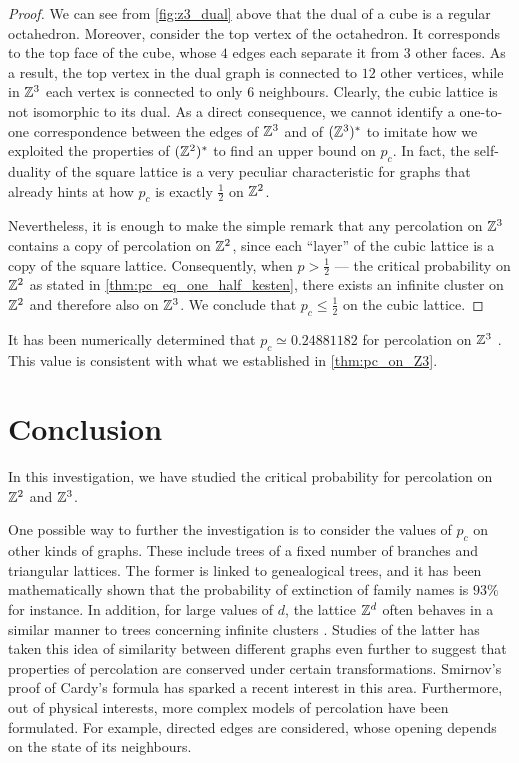 \documentclass[a4paper, 12pt]{article}
\begin{document}
\begin{proof}
We can see from \cref{fig:z3_dual} above that the dual of a cube is a regular octahedron. Moreover, consider the top vertex of the octahedron. It corresponds to the top face of the cube, whose $4$ edges each separate it from $3$ other faces. As a result, the top vertex in the dual graph is connected to $12$ other vertices, while in $\mathbb{Z}^3$ each vertex is connected to only $6$ neighbours. Clearly, the cubic lattice is not isomorphic to its dual. As a direct consequence, we cannot identify a one-to-one correspondence between the edges of $\mathbb{Z}^3$ and of $(\mathbb{Z}^3)^*$ to imitate how we exploited the properties of $(\mathbb{Z}^2)^*$ to find an upper bound on $p_c$. In fact, the self-duality of the square lattice is a very peculiar characteristic for graphs that already hints at how $p_c$ is exactly $\frac{1}{2}$ on $\mathbb{Z}^2$.

Nevertheless, it is enough to make the simple remark that any percolation on $\mathbb{Z}^3$ contains a copy of percolation on $\mathbb{Z}^2$, since each ``layer'' of the cubic lattice is a copy of the square lattice. Consequently, when $p > \frac{1}{2}$ --- the critical probability on $\mathbb{Z}^2$ as stated in \cref{thm:pc_eq_one_half_kesten}, there exists an infinite cluster on $\mathbb{Z}^2$  and therefore also on $\mathbb{Z}^3$. We conclude that $p_c \leq \frac{1}{2}$ on the cubic lattice.
\end{proof}

\begin{rem*}
It has been numerically determined that $p_c \simeq 0.24881182$ for percolation on $\mathbb{Z}^3$ \autocite[1]{zhou_2014}. This value is consistent with what we established in \cref{thm:pc_on_Z3}.
\end{rem*}

\section{Conclusion}
In this investigation, we have studied the critical probability for percolation on $\mathbb{Z}^2$ and $\mathbb{Z}^3$.

One possible way to further the investigation is to consider the values of $p_c$ on other kinds of graphs. These include trees of a fixed number of branches and triangular lattices. The former is linked to genealogical trees, and it has been mathematically shown that the probability of extinction of family names is $93\%$ \autocite[]{gennes_2000} for instance. In addition, for large values of $d$, the lattice $\mathbb{Z}^d$ often behaves in a similar manner to trees concerning infinite clusters \autocite[]{gennes_2000}. Studies of the latter has taken this idea of similarity between different graphs even further to suggest that properties of percolation are conserved under certain transformations. Smirnov's proof of Cardy's formula \autocite*[1]{smirnov_2001} has sparked a recent interest in this area. Furthermore, out of physical interests, more complex models of percolation have been formulated. For example, directed edges are considered, whose opening depends on the state of its neighbours.
\end{document}

